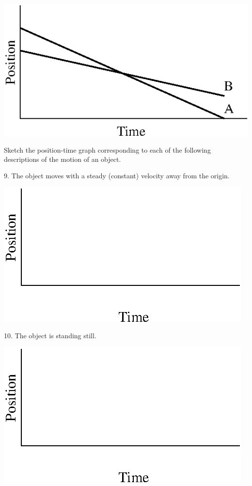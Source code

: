 \vspace{0.3cm}
{\par\raggedright \includegraphics{position_fig12.eps} \par}
\vspace{0.3cm}

Sketch the position-time graph corresponding to each of the following descriptions
of the motion of an object.

9. The object moves with a steady (constant) velocity away from the origin.

\vspace{0.3cm}
{\par\centering \includegraphics{position_fig13.eps} \par}
\vspace{0.3cm}

10. The object is standing still.

\vspace{0.3cm}
{\par\centering \includegraphics{position_fig13.eps} \par}
\vspace{0.3cm}

